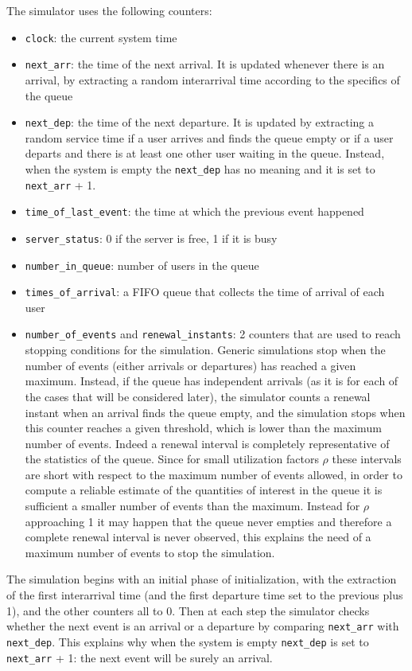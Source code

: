 \documentclass[10pt]{article}
\begin{document}
The simulator uses the following counters:
\begin{itemize}
\item \texttt{clock}: the current system time
\item \texttt{next\_arr}: the time of the next arrival. It is updated whenever there is an arrival, by extracting a random interarrival time according to the specifics of the queue
\item \texttt{next\_dep}: the time of the next departure. It is updated by extracting a random service time if a user arrives and finds the queue empty or if a user departs and there is at least one other user waiting in the queue. Instead, when the system is empty the \texttt{next\_dep} has no meaning and it is set to \texttt{next\_arr} + 1.
\item \texttt{time\_of\_last\_event}: the time at which the previous event happened
\item \texttt{server\_status}: 0 if the server is free, 1 if it is busy
\item \texttt{number\_in\_queue}: number of users in the queue
\item \texttt{times\_of\_arrival}: a FIFO queue that collects the time of arrival of each user
\item \texttt{number\_of\_events} and \texttt{renewal\_instants}: 2 counters that are used to reach stopping conditions for the simulation. Generic simulations stop when the number of events (either arrivals or departures) has reached a given maximum. Instead, if the queue has independent arrivals (as it is for each of the cases that will be considered later), the simulator counts a renewal instant when an arrival finds the queue empty, and the simulation stops when this counter reaches a given threshold, which is lower than the maximum number of events. Indeed a renewal interval is completely representative of the statistics of the queue. Since for small utilization factors $\rho$ these intervals are short with respect to the maximum number of events allowed, in order to compute a reliable estimate of the quantities of interest in the queue it is sufficient a smaller number of events than the maximum. Instead for $\rho$ approaching 1 it may happen that the queue never empties and therefore a complete renewal interval is never observed, this explains the need of a maximum number of events to stop the simulation. 
\end{itemize}

The simulation begins with an initial phase of initialization, with the extraction of the first interarrival time (and the first departure time set to the previous plus 1), and the other counters all to 0. Then at each step the simulator checks whether the next event is an arrival or a departure by comparing \texttt{next\_arr} with \texttt{next\_dep}. This explains why when the system is empty \texttt{next\_dep} is set to \texttt{next\_arr} + 1: the next event will be surely an arrival. 
\end{document}
